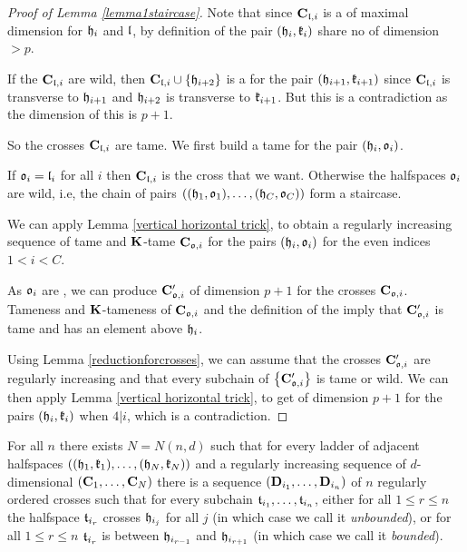 \begin{proof}[Proof of Lemma \ref{lemma1staircase}]
Note that since  $\mathbf{C}_{\mathfrak{l},i}$ is a \intc of maximal dimension for $\mathfrak{h}_i$ and $\mathfrak{l}$, by definition of \adjP the pair $(\mathfrak{h}_i,\mathfrak{k}_i)$ share no \intc of dimension $>p$.

If the $\mathbf{C}_{\mathfrak{l},i}$ are wild, then $\mathbf{C}_{\mathfrak{l},i} \cup \left\{\mathfrak{h}_{i+2}\right\}$ is a \intc for the pair $(\mathfrak{h}_{i+1}, \mathfrak{k}_{i+1})$ since $\mathbf{C}_{\mathfrak{l},i}$ is transverse to $\mathfrak{h}_{i+1}$ and $\mathfrak{h}_{i+2}$ is transverse to $\mathfrak{k}_{i+1}$. But this is a contradiction as the dimension of this \intc is $p+1$.

So the crosses $\mathbf{C}_{\mathfrak{l},i}$ are tame.
We first build a tame \intc for the pair $(\mathfrak{h}_i, \mathfrak{o}_i)$.

If $\mathfrak{o}_i = \mathfrak{l}_i$ for all $i$ then $\mathbf{C}_{\mathfrak{l},i}$ is the cross that we want. Otherwise the halfspaces $\mathfrak{o}_i$ are wild, i.e, the chain of pairs $\left((\mathfrak{h}_{1},\mathfrak{o}_{1}),\ldots,(\mathfrak{h}_{C},\mathfrak{o}_{C})\right)$ form a staircase. 

We can apply Lemma \ref{vertical horizontal trick}, to obtain a regularly increasing sequence of tame and $\mathbf{K}$-tame \intc $\mathbf{C}_{\mathfrak{o},i}$ for the pairs $(\mathfrak{h}_i,\mathfrak{o}_i)$ for the even indices $1<i<C$.

As $\mathfrak{o}_i$ are \countcers, we can produce \countcs $\mathbf{C}'_{\mathfrak{o},i}$ of dimension $p+1$ for the crosses $\mathbf{C}_{\mathfrak{o},i}$. Tameness and $\mathbf{K}$-tameness of $\mathbf{C}_{\mathfrak{o},i}$ and the definition of the \countc imply that $\mathbf{C}'_{\mathfrak{o},i}$ is tame and has an element above $\mathfrak{h}_i$.

Using Lemma \ref{reductionforcrosses}, we can assume that the crosses $\mathbf{C}'_{\mathfrak{o},i}$ are regularly increasing and that every subchain of $\left\{\mathbf{C}'_{\mathfrak{o},i}\right\}$ is tame or wild.
We can then apply Lemma \ref{vertical horizontal trick}, to get \intcs of dimension $p+1$ for the pairs $(\mathfrak{h}_i,\mathfrak{k}_i)$ when $4|i$, which is a contradiction.
\end{proof}

\begin{lemma}\label{lemmaforlemma2}
	For all $n$ there exists $N=N(n,d)$ such that for every ladder of adjacent halfspaces $\left((\mathfrak{h}_{1},\mathfrak{k}_{1}),\ldots,(\mathfrak{h}_{N},\mathfrak{k}_{N})\right)$ and a regularly increasing sequence of $d$-dimensional \intcs $\left(\mathbf{C}_{1},\ldots,\mathbf{C}_{N}\right)$ there is a sequence  $\left(\mathbf{D}_{i_1},\ldots,\mathbf{D}_{i_n}\right)$ of $n$ regularly ordered crosses such that for every subchain $\mathfrak{t}_{i_1},\ldots,\mathfrak{t}_{i_n}$, either for all $1\le r\le n$ the halfspace $\mathfrak{t}_{i_r}$ crosses $\mathfrak{h}_{i_j}$ for all $j$ (in which case we call it \emph{unbounded}), or for all $1\le r\le n$ $\mathfrak{t}_{i_r}$ is between $\mathfrak{h}_{i_{r-1}}$ and $\mathfrak{h}_{i_{r+1}}$ (in which case we call it \emph{bounded}).
\end{lemma}	

